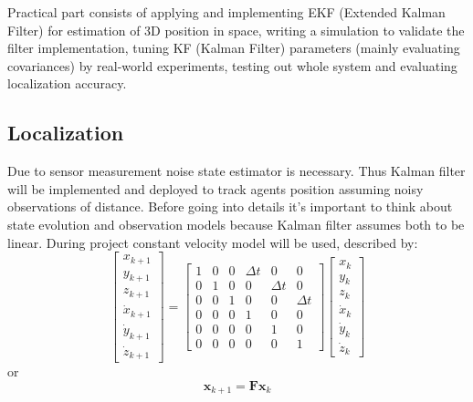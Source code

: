 Practical part consists of applying and implementing EKF (Extended Kalman Filter) for estimation of 3D position in space, writing a simulation to validate the filter implementation, tuning KF (Kalman Filter) parameters (mainly evaluating covariances) by real-world experiments, testing out whole system and evaluating localization accuracy.

\subsection{Localization}

Due to sensor measurement noise state estimator is necessary. Thus Kalman filter will be implemented and deployed to track agents position assuming noisy observations of distance. Before going into details it's important to think about state evolution and observation models because Kalman filter assumes both to be linear. During project constant velocity model will be used, described by:
$$
\left[\begin{array}{c}
x_{k+1} \\
y_{k+1} \\
z_{k+1} \\
\dot{x}_{k+1} \\
\dot{y}_{k+1} \\
\dot{z}_{k+1}
\end{array}\right]=\left[\begin{array}{cccccc}
1 & 0 & 0 & \Delta t & 0 & 0 \\
0 & 1 & 0 & 0 & \Delta t & 0 \\
0 & 0 & 1 & 0 & 0 & \Delta t \\
0 & 0 & 0 & 1 & 0 & 0 \\
0 & 0 & 0 & 0 & 1 & 0 \\
0 & 0 & 0 & 0 & 0 & 1
\end{array}\right]\left[\begin{array}{c}
x_{k} \\
y_{k} \\
z_{k} \\
\dot{x}_{k} \\
\dot{y}_{k} \\
\dot{z}_{k}
\end{array}\right]
$$
or
$$
\boldsymbol{x}_{k+1} = \boldsymbol{F} \boldsymbol{x}_k
$$


